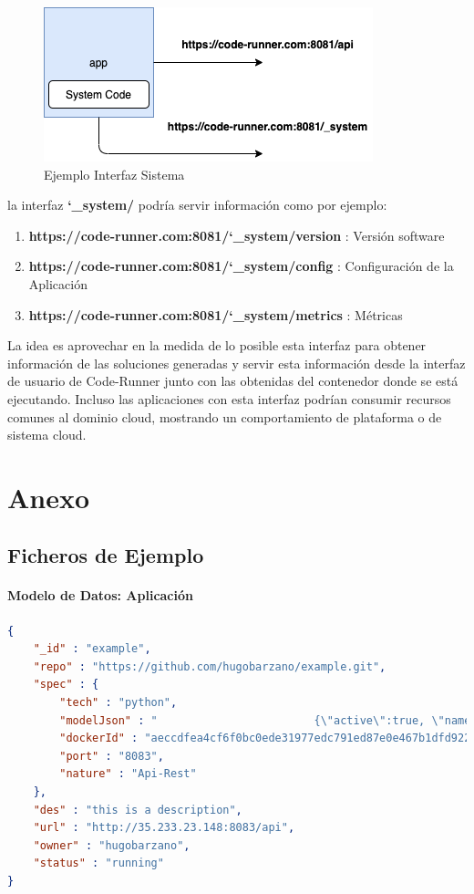 \documentclass[a4paper,11pt]{book}
\begin{document}
   \begin{figure}[H]
\centering
\includegraphics[scale=0.5]{imagenes/system.png}
\caption{ Ejemplo Interfaz Sistema  }
\end{figure}

la interfaz \textbf{\char`_system/} podría servir información como por ejemplo:

\begin{enumerate}
\item\textbf{ https://code-runner.com:8081/\char`_system/version }: Versión software
\item \textbf{https://code-runner.com:8081/\char`_system/config }: Configuración de la Aplicación
\item \textbf{https://code-runner.com:8081/\char`_system/metrics }: Métricas 
\end{enumerate}

La idea es aprovechar en la medida de lo posible esta interfaz para obtener información de las soluciones generadas y servir esta información desde la interfaz de usuario de Code-Runner junto con las obtenidas del contenedor donde se está ejecutando. Incluso las aplicaciones con esta interfaz podrían consumir recursos comunes al dominio cloud, mostrando un comportamiento de plataforma o de sistema cloud. 

\chapter{ Anexo}

\section{Ficheros de Ejemplo}

\subsubsection{Modelo de Datos:  Aplicación}\label{anexmodel}


\begin{lstlisting}[language=json,firstnumber=1]
{
    "_id" : "example",
    "repo" : "https://github.com/hugobarzano/example.git",
    "spec" : {
        "tech" : "python",
        "modelJson" : "                        {\"active\":true, \"name\":\"thing name\", \"value\":33}\r\n                    ",
        "dockerId" : "aeccdfea4cf6f0bc0ede31977edc791ed87e0e467b1dfd9222005e63feff8598",
        "port" : "8083",
        "nature" : "Api-Rest"
    },
    "des" : "this is a description",
    "url" : "http://35.233.23.148:8083/api",
    "owner" : "hugobarzano",
    "status" : "running"
}
\end{lstlisting}
\end{document}
